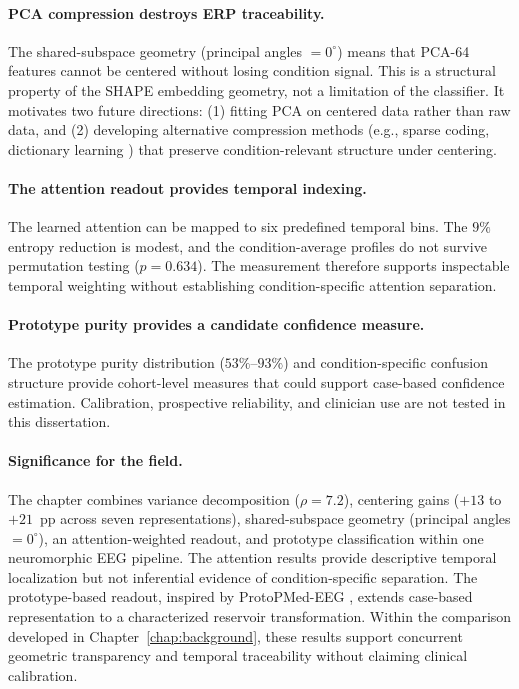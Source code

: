 \paragraph{PCA compression destroys ERP traceability.} The shared-subspace geometry (principal angles $= 0^\circ$) means that PCA-64 features cannot be centered without losing condition signal. This is a structural property of the SHAPE embedding geometry, not a limitation of the classifier. It motivates two future directions: (1) fitting PCA on centered data rather than raw data, and (2) developing alternative compression methods (e.g., sparse coding, dictionary learning \cite{tang_sparse_snn_2017}) that preserve condition-relevant structure under centering.

\paragraph{The attention readout provides temporal indexing.} The learned attention can be mapped to six predefined temporal bins. The $9\%$ entropy reduction is modest, and the condition-average profiles do not survive permutation testing ($p = 0.634$). The measurement therefore supports inspectable temporal weighting without establishing condition-specific attention separation.

\paragraph{Prototype purity provides a candidate confidence measure.} The prototype purity distribution ($53\%$--$93\%$) and condition-specific confusion structure provide cohort-level measures that could support case-based confidence estimation. Calibration, prospective reliability, and clinician use are not tested in this dissertation.

\paragraph{Significance for the field.} The chapter combines variance decomposition ($\rho = 7.2$), centering gains ($+13$ to $+21$~pp across seven representations), shared-subspace geometry (principal angles $= 0^\circ$), an attention-weighted readout, and prototype classification within one neuromorphic EEG pipeline. The attention results provide descriptive temporal localization but not inferential evidence of condition-specific separation. The prototype-based readout, inspired by ProtoPMed-EEG \cite{barnett_protopmed_2024}, extends case-based representation to a characterized reservoir transformation. Within the comparison developed in Chapter~\ref{chap:background}, these results support concurrent geometric transparency and temporal traceability without claiming clinical calibration.

